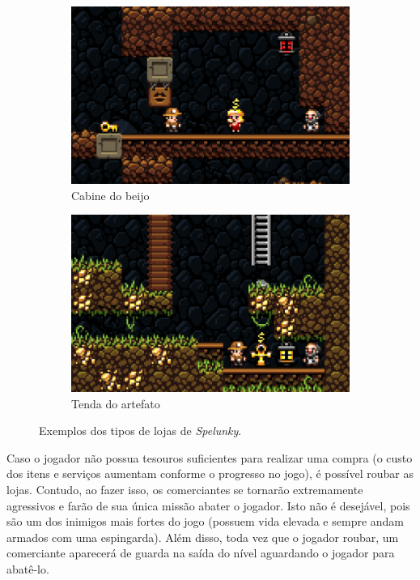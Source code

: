 \begin{figure}[htb!]
	\begin{subfigure}[b]{0.4\textwidth}
		\includegraphics[width=\textwidth]{fig/spelunky-shop-kiss.pdf}
		\caption{Cabine do beijo}
		\label{fig:spelunky-shop-kiss}
	\end{subfigure}
	\begin{subfigure}[b]{0.4\textwidth}
		\includegraphics[width=\textwidth]{fig/spelunky-shop-ankh.pdf}
		\caption{Tenda do artefato}
		\label{fig:spelunky-shop-ankh}
	\end{subfigure}
	\caption{Exemplos dos tipos de lojas de \textit{Spelunky}.}
	\label{fig:spelunky-shop-examples}
\end{figure}


Caso o jogador não possua tesouros suficientes para realizar uma compra (o custo
dos itens e serviços aumentam conforme o progresso no jogo), é possível roubar
as lojas. Contudo, ao fazer isso, os comerciantes se tornarão extremamente
agressivos e farão de sua única missão abater o jogador. Isto não é desejável,
pois são um dos inimigos mais fortes do jogo (possuem vida elevada e sempre
andam armados com uma espingarda). Além disso, toda vez que o jogador roubar, um
comerciante aparecerá de guarda na saída do nível aguardando o jogador para
abatê-lo. 


